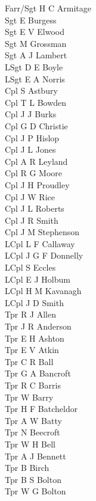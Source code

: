 \begin{multicols}{2}
  \noindent
  Farr/Sgt H C Armitage \\
  Sgt E Burgess \\
  Sgt E V Elwood \\
  Sgt M Grossman \\
  Sgt A J Lambert \\
  LSgt D E Boyle \\
  LSgt E A Norris \\
  Cpl S Astbury \\
  Cpl T L Bowden \\
  Cpl J J Burks \\
  Cpl G D Christie \\
  Cpl J P Hislop \\
  Cpl J L Jones \\
  Cpl A R Leyland \\
  Cpl R G Moore \\
  Cpl J H Proudley \\
  Cpl J W Rice \\
  Cpl J L Roberts \\
  Cpl J R Smith \\
  Cpl J M Stephenson \\
  LCpl L F Callaway \\
  LCpl J G F Donnelly \\
  LCpl S Eccles \\
  LCpl E J Holbum \\
  LCpl H M Kavanagh \\
  LCpl J D Smith \\
  Tpr R J Allen \\
  Tpr J R Anderson \\
  Tpr E H Ashton \\
  Tpr E V Atkin \\
  Tpr C R Ball \\
  Tpr G A Bancroft \\
  Tpr R C Barris \\
  Tpr W Barry \\
  Tpr H F Batcheldor \\
  Tpr A W Batty \\
  Tpr N Beecroft \\
  Tpr W H Bell \\
  Tpr A J Bennett \\
  Tpr B Birch \\
  Tpr B S Bolton \\
  Tpr W G Bolton \\

\end{multicols}

